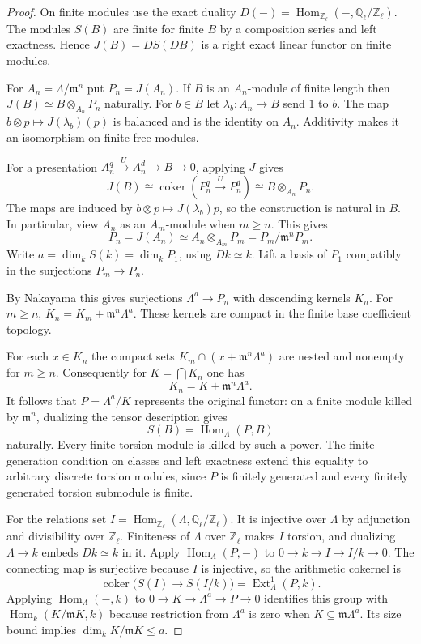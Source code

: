 \begin{proof}
On finite modules use the exact duality
\(D(-)=\operatorname{Hom}_{\mathbb Z_\ell}(-,
\mathbb Q_\ell/\mathbb Z_\ell)\). The modules \(S(B)\) are
finite for finite \(B\) by a composition series and left
exactness. Hence \(J(B)=D S(D B)\) is a right exact linear
functor on finite modules.

For \(A_n=\Lambda/\mathfrak m^n\)
put \(P_n=J(A_n)\). If \(B\) is an \(A_n\)-module of finite
length then \(J(B)\simeq B\otimes_{A_n}P_n\) naturally.
For \(b\in B\) let \(\lambda_b:A_n\to B\) send \(1\) to
\(b\). The map \(b\otimes p\mapsto J(\lambda_b)(p)\)
is balanced and is the identity on \(A_n\). Additivity makes
it an isomorphism on finite free modules.

For a presentation \(A_n^q\xrightarrow{U}A_n^d\to B\to0\),
applying \(J\) gives
\[
       J(B)\cong \operatorname{coker}
                    (P_n^q\xrightarrow{U}P_n^d)
                \cong B\otimes_{A_n}P_n .
\]
The maps are induced by \(b\otimes p\mapsto J(\lambda_b)p\),
so the construction is natural in \(B\). In particular, view \(A_n\)
as an \(A_m\)-module when \(m\ge n\). This gives
\[
      P_n=J(A_n)\simeq A_n\otimes_{A_m}P_m
                       =P_m/\mathfrak m^nP_m .
\]
Write \(a=\dim_k S(k)=\dim_k P_1\), using \(Dk\simeq k\).
Lift a basis of \(P_1\) compatibly in the surjections \(P_m\to P_n\).

By Nakayama this gives surjections \(\Lambda^a\to P_n\) with
descending kernels \(K_n\). For \(m\ge n\),
\(K_n=K_m+\mathfrak m^n\Lambda^a\).
These kernels are compact in the finite base coefficient
topology.

For each \(x\in K_n\) the compact sets
\(K_m\cap(x+\mathfrak m^n\Lambda^a)\) are nested and
nonempty for \(m\ge n\). Consequently for \(K=\bigcap K_n\)
one has
\[
 K_n=K+\mathfrak m^n\Lambda^a.
\]
It follows that
\(P=\Lambda^a/K\) represents the original functor:
on a finite module killed by \(\mathfrak m^n\), dualizing the
tensor description gives
\[
 S(B)=\operatorname{Hom}_\Lambda(P,B)
\]
naturally. Every finite torsion module is killed by such a
power. The finite-generation condition on classes and left
exactness extend this equality to arbitrary discrete torsion
modules, since \(P\) is finitely generated and every finitely
generated torsion submodule is finite.

For the relations set
\(I=\operatorname{Hom}_{\mathbb Z_\ell}(\Lambda,
\mathbb Q_\ell/\mathbb Z_\ell)\). It is injective over
\(\Lambda\) by adjunction and divisibility over \(\mathbb Z_\ell\).
Finiteness of \(\Lambda\) over \(\mathbb Z_\ell\) makes \(I\)
torsion, and dualizing \(\Lambda\to k\) embeds \(Dk\simeq k\)
in it. Apply \(\operatorname{Hom}_\Lambda(P,-)\) to
\(0\to k\to I\to I/k\to0\). The connecting map is surjective
because \(I\) is injective, so the arithmetic cokernel is
\[
 \operatorname{coker}\bigl(S(I)\longrightarrow S(I/k)\bigr)
          =\operatorname{Ext}^1_\Lambda(P,k).
\]
Applying \(\operatorname{Hom}_\Lambda(-,k)\) to
\(0\to K\to\Lambda^a\to P\to0\) identifies this group
with \(\operatorname{Hom}_k(K/\mathfrak mK,k)\) because restriction
from \(\Lambda^a\) is zero when
\(K\subseteq\mathfrak m\Lambda^a\).
Its size bound implies \(\dim_k K/\mathfrak m K\le a\).


\end{proof}
